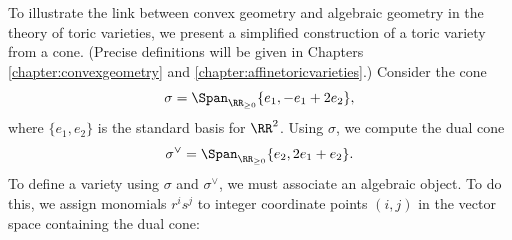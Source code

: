 \documentclass[12pt]{amsart}
\theoremstyle{plain}
\begin{document}
To illustrate the link between convex geometry and algebraic geometry in the theory of toric varieties, we present a simplified construction of a toric variety from a cone.
(Precise definitions will be given in Chapters \ref{chapter:convexgeometry} and \ref{chapter:affinetoricvarieties}.)
Consider the cone
$$\sigma = \Span_{\RR_{\ge 0}}\{e_1, -e_1+2e_2\},$$
where $\{e_1, e_2\}$ is the standard basis for $\RR^2$.
Using $\sigma$, we compute the dual cone
$$\sigma^\vee = \Span_{\RR_{\ge 0}}\{e_2, 2e_1+ e_2\}.$$
To define a variety using $\sigma$ and $\sigma^\vee$, we must associate an algebraic object.
To do this, we assign monomials $r^i s^j$ to integer coordinate points $(i, j)$ in the vector space containing the dual cone:
\begin{figure}[H]
    \centering
\end{figure}
\end{document}
